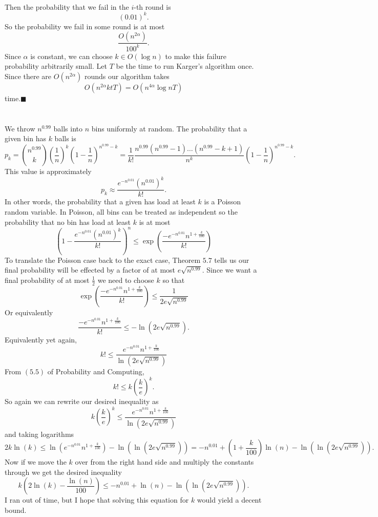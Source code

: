 \documentclass[letterpaper,12pt,oneside,onecolumn]{article}
\begin{document}
\paragraph{}
Then the probability that we fail in the $i$-th round is
$$(0.01)^k.$$
So the probability we fail in some round is at most
$$\frac{O(n^{2\alpha})}{100^k}.$$
Since $\alpha$ is constant, we can choose $k \in O(\log n)$ to make this failure probability arbitrarily small. Let $T$ be the time to run Karger's algorithm once.  Since there are $O(n^{2\alpha})$ rounds our algorithm takes
$$O(n^{2\alpha}ktT) = O(n^{4\alpha}\log n T)$$
time.$ \blacksquare$

\newpage
\section{}
\paragraph{}
We throw $n^{0.99}$ balls into $n$ bins uniformly at random.  The probability that a given bin has $k$ balls is 
$$p_k = {n^{0.99} \choose k} (\frac{1}{n})^k(1-\frac{1}{n})^{n^{0.99}-k} = \frac{1}{k!}\frac{n^{0.99}(n^{0.99}-1)\dots(n^{0.99} - k + 1)}{n^k}(1-\frac{1}{n})^{n^{0.99}-k}.$$
This value is approximately
$$p_k \approx \frac{e^{-n^{0.01}}(n^{0.01})^k}{k!}.$$
In other words, the probability that a given has load at least $k$ is a Poisson random variable.  In Poisson, all bins can be treated as independent so the probability that no bin has load at least $k$ is at most
$$(1-\frac{e^{-n^{0.01}}(n^{0.01})^k}{k!})^n\leq \exp(\frac{-e^{-n^{0.01}}n^{1 + \frac{k}{100}}}{k!})$$
To translate the Poisson case back to the exact case, Theorem $5.7$ tells us our final probability will be effected by a factor of at most $e\sqrt{n^{0.99}}$. Since we want a final probability of at most $\frac{1}{2}$ we need to choose $k$ so that 
$$\exp(\frac{-e^{-n^{0.01}}n^{1 + \frac{k}{100}}}{k!}) \leq \frac{1}{2e\sqrt{n^{0.99}}}$$
Or equivalently
$$\frac{-e^{-n^{0.01}}n^{1 + \frac{k}{100}}}{k!} \leq -\ln(2e\sqrt{n^{0.99}}).$$
Equivalently yet again,
$$k! \leq \frac{e^{-n^{0.01}}n^{1 + \frac{k}{100}}}{\ln(2e\sqrt{n^{0.99}})}$$
From $(5.5)$ of Probability and Computing, 
$$k! \leq k(\frac{k}{e})^k.$$
So again we can rewrite our desired inequality as
$$k(\frac{k}{e})^k \leq \frac{e^{-n^{0.01}}n^{1 + \frac{k}{100}}}{\ln(2e\sqrt{n^{0.99}})}$$
and taking logarithms
$$2k\ln(k) \leq \ln(e^{-n^{0.01}}n^{1 + \frac{k}{100}}) - \ln(\ln(2e\sqrt{n^{0.99}}) )= -n^{0.01} + (1+\frac{k}{100})\ln(n) - \ln(\ln(2e\sqrt{n^{0.99}})).$$
Now if we move the $k$ over from the right hand side and multiply the constants through we get the desired inequality
$$k(2\ln(k) - \frac{\ln(n)}{100}) \leq -n^{0.01} + \ln(n) - \ln(\ln(2e\sqrt{n^{0.99}})).$$
I ran out of time, but I hope that solving this equation for $k$ would yield a decent bound.
\newpage
\end{document}
